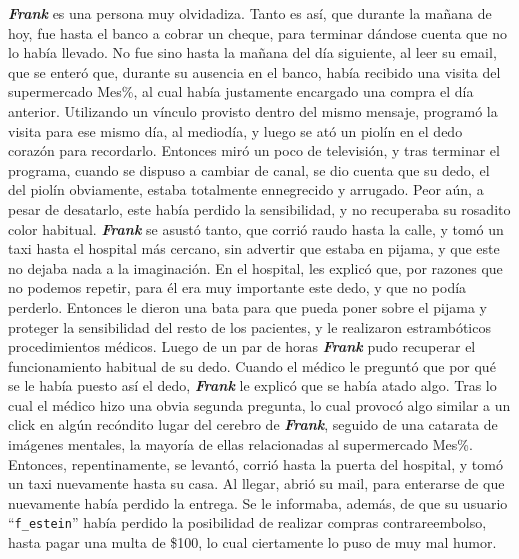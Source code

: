 \textbf{\emph{Frank}} es una persona muy olvidadiza. Tanto es así, que durante
la mañana de hoy, fue hasta el banco a cobrar un cheque, para terminar dándose
cuenta que no lo había llevado. No fue sino hasta la mañana del día siguiente,
al leer su email, que se enteró que, durante su ausencia en el banco, había
recibido una visita del supermercado Mes\%, al cual había justamente encargado
una compra el día anterior. Utilizando un vínculo provisto dentro del mismo
mensaje, programó la visita para ese mismo día, al mediodía, y luego se ató un
piolín en el dedo corazón para recordarlo. Entonces miró un poco de televisión,
y tras terminar el programa, cuando se dispuso a cambiar de canal, se dio cuenta
que su dedo, el del piolín obviamente, estaba totalmente ennegrecido y arrugado.
Peor aún, a pesar de desatarlo, este había perdido la sensibilidad, y no
recuperaba su rosadito color habitual. \textbf{\emph{Frank}} se asustó tanto,
que corrió raudo hasta la calle, y tomó un taxi hasta el hospital más cercano,
sin advertir que estaba en pijama, y que este no dejaba nada a la imaginación.
En el hospital, les explicó que, por razones que no podemos repetir, para él era
muy importante este dedo, y que no podía perderlo. Entonces le dieron una bata
para que pueda poner sobre el pijama y proteger la sensibilidad del resto de los
pacientes, y le realizaron estrambóticos procedimientos médicos. Luego de un par
de horas \textbf{\emph{Frank}} pudo recuperar el funcionamiento habitual de su
dedo. Cuando el médico le preguntó que por qué se le había puesto así el dedo,
\textbf{\emph{Frank}} le explicó que se había atado algo. Tras lo cual el médico
hizo una obvia segunda pregunta, lo cual provocó algo similar a un click en
algún recóndito lugar del cerebro de \textbf{\emph{Frank}}, seguido de una
catarata de imágenes mentales, la mayoría de ellas relacionadas al supermercado
Mes\%. Entonces, repentinamente, se levantó, corrió hasta la puerta del
hospital, y tomó un taxi nuevamente hasta su casa. Al llegar, abrió su mail,
para enterarse de que nuevamente había perdido la entrega. Se le informaba,
además, de que su usuario ``\texttt{f\_estein}'' había perdido la posibilidad de
realizar compras contrareembolso, hasta pagar una multa de \$100, lo cual
ciertamente lo puso de muy mal humor.







